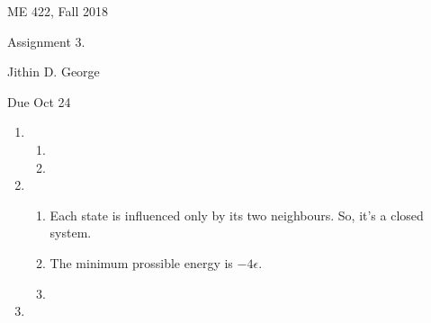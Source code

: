 \documentclass[letterpaper,12pt]{article}
\begin{document}




\noindent
{\scriptsize ME 422, Fall 2018} \hfill

\begin{center}
\large
Assignment 3.
\normalsize

Jithin D. George
\end{center}

\noindent
Due Oct 24
\vspace{.3in}




\noindent


\begin{enumerate}
\item



\begin{enumerate}
\item

\item

\end{enumerate}


\item

\begin{enumerate}
\item Each state is influenced only by its two neighbours. So, it's a closed system.

\item
 The minimum prossible energy is  $-4  \epsilon$.

 \item


\end{enumerate}

\item
\end{enumerate}
\end{document}
